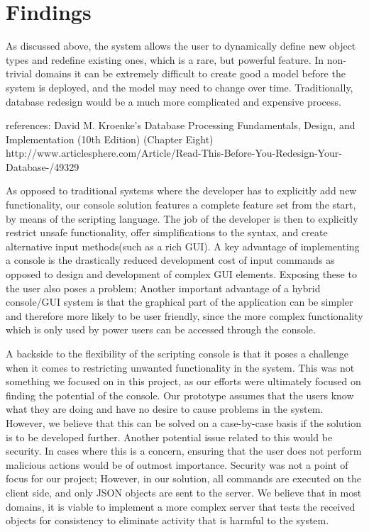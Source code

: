 \section{Findings}
As discussed above, the system allows the user to dynamically define new object types and redefine existing ones, which is a rare, but powerful feature. In non-trivial domains it can be extremely difficult to create good a model before the system is deployed, and the model may need to change over time. Traditionally, database redesign would be a much more complicated and expensive process.

references:
David M. Kroenke’s Database Processing Fundamentals, Design, and Implementation (10th Edition) (Chapter Eight)
http://www.articlesphere.com/Article/Read-This-Before-You-Redesign-Your-Database-/49329

As opposed to traditional systems where the developer has to explicitly add new functionality, our console solution features a complete feature set from the start, by means of the scripting language. The job of the developer is then to explicitly restrict unsafe functionality, offer simplifications to the syntax, and create alternative input methods(such as a rich GUI). A key advantage of implementing a console is the drastically reduced development cost of input commands as opposed to design and development of complex GUI elements. Exposing these to the user also poses a problem; Another important advantage of a hybrid console/GUI system is that the graphical part of the application can be simpler and therefore more likely to be user friendly, since the more complex functionality which is only used by power users can be accessed through the console. 

A backside to the flexibility of the scripting console is that it poses a challenge when it comes to restricting unwanted functionality in the system. This was not something we focused on in this project, as our efforts were ultimately focused on finding the potential of the console. Our prototype assumes that the users know what they are doing and have no desire to cause problems in the system. However, we believe that this can be solved on a case-by-case basis if the solution is to be developed further. Another potential issue related to this would be security. In cases where this is a concern, ensuring that the user does not perform malicious actions would be of outmost importance. Security was not a point of focus for our project; However, in our solution, all commands are executed on the client side, and only JSON objects are sent to the server. We believe that in most domains, it is viable to implement a more complex server that tests the received objects for consistency to eliminate activity that is harmful to the system.

